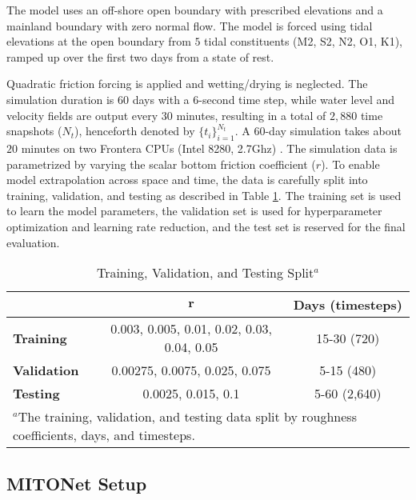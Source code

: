\documentclass[draft]{agujournal2019}
\begin{document}
The model uses an off-shore open boundary with prescribed elevations and a mainland boundary with zero normal flow. The model is forced using tidal elevations at the open boundary from $5$ tidal constituents (M2, S2, N2, O1, K1), ramped up over the first two days from a state of rest. 

Quadratic friction forcing is applied and wetting/drying is neglected. The simulation duration is $60$ days with a $6$-second time step, while water level and velocity fields are output every $30$ minutes, resulting in a total of $2,880$ time snapshots ($N_t$), henceforth denoted by $\{t_i\}_{i=1}^{N_t}$. A $60$-day simulation takes about $20$ minutes on two Frontera CPUs (Intel 8280, 2.7Ghz) \cite{stanzione2020frontera}. The simulation data is parametrized by varying the scalar bottom friction coefficient ($r$). To enable model extrapolation across space and time, the data is carefully split into training, validation, and testing as described in Table \ref{tab:train_val_test}. The training set is used to learn the model parameters, the validation set is used for hyperparameter optimization and learning rate reduction, and the test set is reserved for the final evaluation.

\begin{table}[h]
\caption{Training, Validation, and Testing Split$^{a}$}
\centering
\begin{tabular}{l c c}
\hline
      & $\boldsymbol{r}$                 & \textbf{Days (timesteps)} \\
\hline
\textbf{Training}   & 0.003, 0.005, 0.01, 0.02, 0.03, 0.04, 0.05  & 15-30 (720) \\
\textbf{Validation} & 0.00275, 0.0075, 0.025, 0.075               & 5-15 (480) \\
\textbf{Testing}    & 0.0025, 0.015, 0.1                          & 5-60 (2,640) \\
\hline
\multicolumn{3}{l}{$^{a}$The training, validation, and testing data split by roughness coefficients, days, and timesteps.}
\end{tabular}
\label{tab:train_val_test}
\end{table}

\subsection{MITONet Setup}
\end{document}
